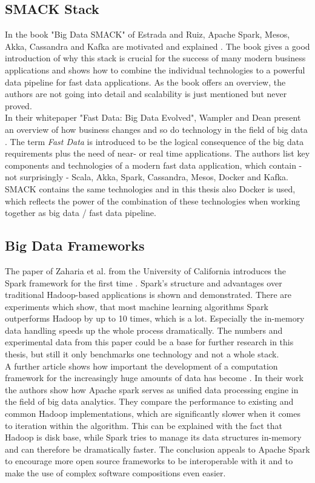 \subsection{SMACK Stack}
In the book "Big Data SMACK" of Estrada and Ruiz, Apache Spark, Mesos, Akka, Cassandra and Kafka are motivated and explained \cite{estrada2016big}.
The book gives a good introduction of why this stack is crucial for the success of many modern business applications and shows how to combine the individual technologies to a powerful data pipeline for fast data applications.
As the book offers an overview, the authors are not going into detail and scalability is just mentioned but never proved.\\

In their whitepaper "Fast Data: Big Data Evolved", Wampler and Dean present an overview of how business changes and so do technology in the field of big data \cite{wampler2016fast}.
The term \textit{Fast Data} is introduced to be the logical consequence of the big data requirements plus the need of near- or real time applications.
The authors list key components and technologies of a modern fast data application, which contain - not surprisingly - Scala, Akka, Spark, Cassandra, Mesos, Docker and Kafka.
SMACK contains the same technologies and in this thesis also Docker is used, which reflects the power of the combination of these technologies when working together as big data / fast data pipeline.\\


\subsection{Big Data Frameworks}
The paper of Zaharia et al. from the University of California introduces the Spark framework for the first time \cite{zaharia2010spark}.
Spark's structure and advantages over traditional Hadoop-based applications is shown and demonstrated.
There are experiments which show, that most machine learning algorithms Spark outperforms Hadoop by up to 10 times, which is a lot.
Especially the in-memory data handling speeds up the whole process dramatically.
The numbers and experimental data from this paper could be a base for further research in this thesis, but still it only benchmarks one technology and not a whole stack.\\
A further article shows how important the development of a computation framework for the increasingly huge amounts of data has become \cite{zaharia2016apache}.
In their work the authors show how Apache spark serves as unified data processing engine in the field of big data analytics.
They compare the performance to existing and common Hadoop implementations, which are significantly slower when it comes to iteration within the algorithm.
This can be explained with the fact that Hadoop is disk base, while Spark tries to manage its data structures in-memory and can therefore be dramatically faster.
The conclusion appeals to Apache Spark to encourage more open source frameworks to be interoperable with it and to make the use of complex software compositions even easier.\\

